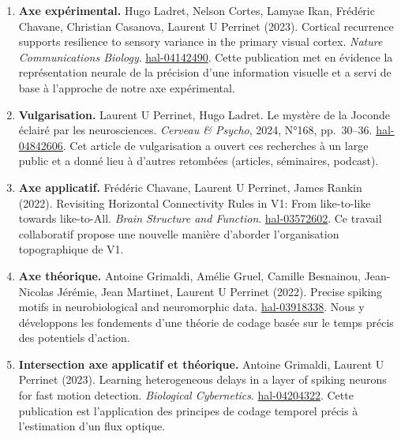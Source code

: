 \documentclass[11pt,french,a4paper,oneside]{article}
\begin{document}
\begin{enumerate}

\item \textbf{Axe expérimental.} Hugo Ladret, Nelson Cortes, Lamyae Ikan, Frédéric Chavane, Christian Casanova, Laurent U Perrinet (2023). \og Cortical recurrence supports resilience to sensory variance in the primary visual cortex. \fg{} \emph{Nature Communications Biology}. \href{https://hal.science/hal-04142490v1}{hal-04142490}. Cette publication met en évidence la représentation neurale de la précision d'une information visuelle et a servi de base à l'approche de notre axe expérimental.

\item \textbf{Vulgarisation.} Laurent U Perrinet, Hugo Ladret. \og Le mystère de la Joconde éclairé par les neurosciences. \fg{} \emph{Cerveau \& Psycho}, 2024, N°168, pp.~30--36. \href{https://hal.science/hal-04842606v1}{hal-04842606}. Cet article de vulgarisation a ouvert ces recherches à un large public et a donné lieu à d'autres retombées (articles, séminaires, podcast).

\item \textbf{Axe applicatif.} Frédéric Chavane, Laurent U Perrinet, James Rankin (2022). \og Revisiting Horizontal Connectivity Rules in V1: From like-to-like towards like-to-All. \fg{} \emph{Brain Structure and Function}. \href{https://hal.science/hal-03572602}{hal-03572602}. Ce travail collaboratif propose une nouvelle manière d'aborder l'organisation topographique de V1.

\item \textbf{Axe théorique.} Antoine Grimaldi, Amélie Gruel, Camille Besnainou, Jean-Nicolas Jérémie, Jean Martinet, Laurent U Perrinet (2022). \og Precise spiking motifs in neurobiological and neuromorphic data. \fg{} \href{https://hal.science/hal-03918338v1}{hal-03918338}. Nous y développons les fondements d'une théorie de codage basée sur le temps précis des potentiels d'action.

\item \textbf{Intersection axe applicatif et théorique.} Antoine Grimaldi, Laurent U Perrinet (2023). \og Learning heterogeneous delays in a layer of spiking neurons for fast motion detection. \fg{} \emph{Biological Cybernetics}. \href{https://hal.science/hal-04204322v1}{hal-04204322}. Cette publication est l'application des principes de codage temporel précis à l'estimation d'un flux optique.

\end{enumerate}
\end{document}
